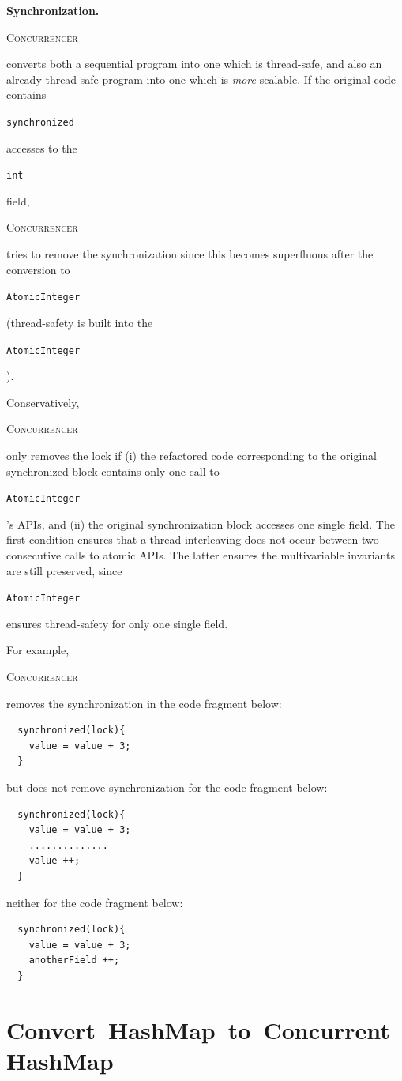 \documentclass[10pt,twocolumn]{article}
\newcommand{\tool}{\begin{scriptsize}\textsc{Concurrencer}\end{scriptsize}\xspace}
\newcommand{\code}[1]{\begin{smaller}\texttt{#1}\end{smaller}}
\newcommand{\myParagraph}[1]{\textbf{#1}}
\begin{document}
\myParagraph{Synchronization.}
\tool converts both a sequential program into one which is thread-safe, and
also an already thread-safe program into one which is \emph{more} scalable.
If the original code contains \code{synchronized} accesses to the \code{int}
field, \tool tries to remove the synchronization since this becomes superfluous
after the conversion to \code{AtomicInteger} (thread-safety is built into the
\code{AtomicInteger}). 

Conservatively, \tool only removes the lock if (i) the refactored code
corresponding to the original synchronized block contains only one call to
\code{AtomicInteger}'s APIs, and (ii) the original synchronization block
accesses one single field. The first condition ensures that a thread
interleaving does not occur between two consecutive calls to atomic APIs. The
latter ensures the multivariable invariants are still preserved, since
\code{AtomicInteger} ensures thread-safety for only one single field.

For example, \tool removes the synchronization in the code fragment below:

{\scriptsize
\begin{verbatim}
  synchronized(lock){
    value = value + 3;
  }
\end{verbatim}
}
\noindent
but does not remove synchronization for the code fragment below:
{\scriptsize
\begin{verbatim}
  synchronized(lock){
    value = value + 3;
    ..............
    value ++;
  }
\end{verbatim}
}
\noindent
neither for the code fragment below:
{\scriptsize
\begin{verbatim}
  synchronized(lock){
    value = value + 3;
    anotherField ++;
  }
\end{verbatim}
}



\section{\hspace{-.25em}\mbox{Convert HashMap to ConcurrentHashMap}}
\end{document}

